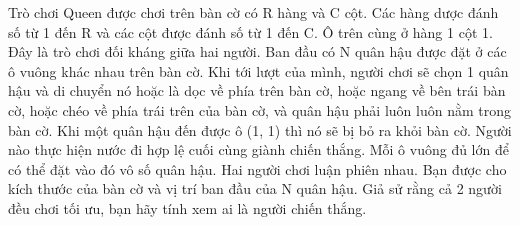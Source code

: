 Trò chơi Queen được chơi trên bàn cờ có R hàng và C cột. Các hàng dược đánh số từ 1 đến R và các cột được đánh số từ 1 đến C. Ô trên cùng ở hàng 1 cột 1. Đây là trò chơi đối kháng giữa hai người. Ban đầu có N quân hậu được đặt ở các ô vuông khác nhau trên bàn cờ. Khi tới lượt của mình, người chơi sẽ chọn 1 quân hậu và di chuyển nó hoặc là dọc về phía trên bàn cờ, hoặc ngang về bên trái bàn cờ, hoặc chéo về phía trái trên của bàn cờ, và quân hậu phải luôn luôn nằm trong bàn cờ. Khi một quân hậu đến được ô (1, 1) thì nó sẽ bị bỏ ra khỏi bàn cờ. Người nào thực hiện nước đi hợp lệ cuối cùng giành chiến thắng. Mỗi ô vuông đủ lớn để có thể đặt vào đó vô số quân hậu. Hai người chơi luận phiên nhau. Bạn được cho kích thước của bàn cờ và vị trí ban đầu của N quân hậu. Giả sử rằng cả 2 người đều chơi tối ưu, bạn hãy tính xem ai là người chiến thắng.
